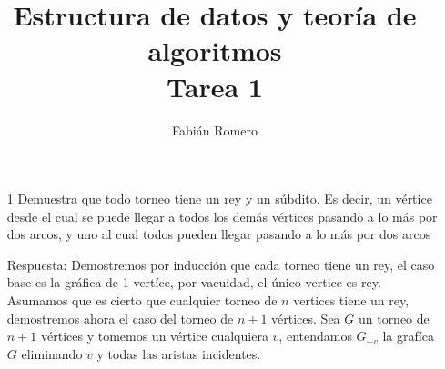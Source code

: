 \documentclass[12pt]{article}
\title{Estructura de datos y teoría de algoritmos\\ Tarea 1 }
\author{Fabián Romero}
\begin{document}
\maketitle

\begin{itemize}
  \item[1] Demuestra que todo torneo tiene un rey y un súbdito. Es decir, un vértice desde el cual se puede llegar a todos los demás vértices pasando a lo más por dos arcos, y uno al cual todos pueden llegar pasando a lo más por dos arcos

  \item[Respuesta:] Demostremos por inducción que cada torneo tiene un rey, el caso base es la gráfica de 1 vertíce, por vacuidad, el único vertice es rey.\\
    Asumamos que es cierto que cualquier torneo de $n$ vertices tiene un rey, demostremos ahora el caso del torneo de $n+1$ vértices.
    Sea $G$ un torneo de $n+1$ vértices y tomemos un vértice cualquiera $v$, entendamos $G_{-v}$ la grafíca $G$ eliminando $v$ y todas las aristas incidentes.



\end{itemize}
\end{document}
